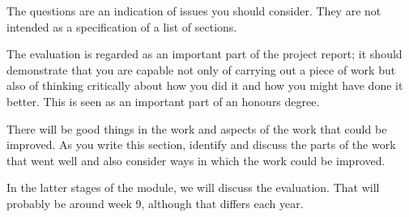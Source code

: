 The questions are an indication of issues you should consider. They are not intended as a specification of a list of sections.

The evaluation is regarded as an important part of the project report; it should demonstrate that you are capable not only of carrying out a piece of work but also of thinking critically about how you did it and how you might have done it better. This is seen as an important part of an honours degree. 

There will be good things in the work and aspects of the work that could be improved. As you write this section, identify and discuss the parts of the work that went well and also consider ways in which the work could be improved. 

In the latter stages of the module, we will discuss the evaluation. That will probably be around week 9, although that differs each year. 
